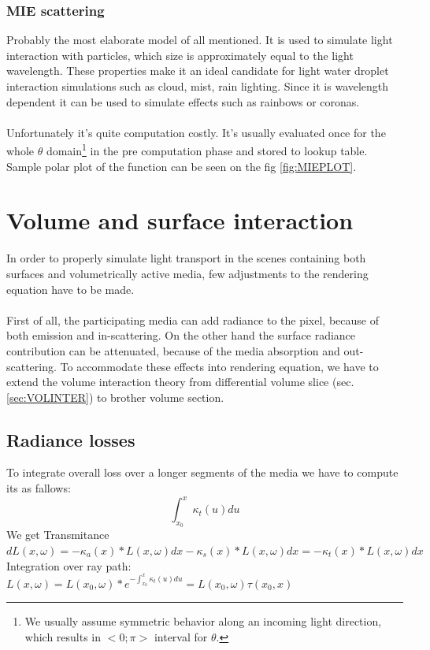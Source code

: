 \subsubsection{MIE scattering}
\label{lab:MIE}
Probably the most elaborate model of all mentioned. It is used to simulate light interaction with particles, which size is approximately equal to the light wavelength. These properties make it an ideal candidate for light water droplet interaction simulations such as cloud, mist, rain lighting. Since it is wavelength dependent it can be used to simulate effects such as rainbows or coronas.
\\
\\
Unfortunately it's quite computation costly. It's usually evaluated once for the whole $\theta$ domain\footnote{We usually assume symmetric behavior along an incoming light direction, which results in $<0;\pi>$ interval for $\theta$.} in the pre computation phase and stored to lookup table. Sample polar plot of the function can be seen on the fig \ref{fig:MIEPLOT}.


\clearpage{}
\section{Volume and surface interaction}
\label{sec:EXTREND}
In order to properly simulate light transport in the scenes containing both surfaces and volumetrically active media, few adjustments to the rendering equation have to be made.
\\
\\
First of all, the participating media can add radiance to the pixel, because of both emission and in-scattering. On the other hand the surface radiance contribution can be attenuated, because of the media absorption and out-scattering. To accommodate these effects into rendering equation, we have to extend the volume interaction theory  from differential volume slice (sec. \ref{sec:VOLINTER}) to brother volume section.

\subsection{Radiance losses}
To integrate overall loss over a longer segments of the media we have to compute its  as fallows:
\begin{equation}
 	\int_{x_{0}}^{x}\kappa_t(u)du
 \end{equation}
We get Transmitance
$dL(x,\omega)=-\kappa_a(x)*L(x,\omega)dx-\kappa_s(x)*L(x,\omega)dx =-\kappa_t(x)*L(x,\omega)dx$
Integration over ray path:
$L(x,\omega)=L(x_0,\omega)*e^{-\int_{x_{0}}^{x}\kappa_t(u)du}=L(x_0,\omega)\tau(x_0,x)$


